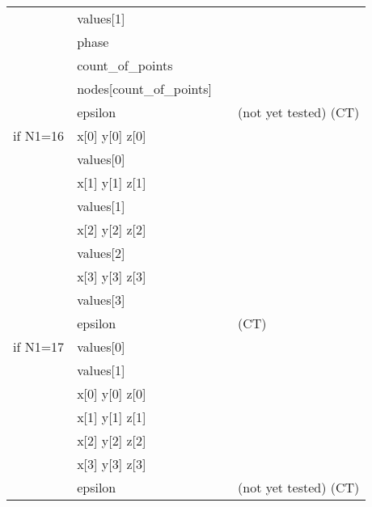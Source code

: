 \begin{tabular}{|p{1.5cm}|p{2.75cm}|c|p{8.5cm}|}
            & {\footnotesize values[1]}            &      &                        \\
            & {\footnotesize phase}                &      &                        \\
            & {\footnotesize count\_of\_points}    &      &                        \\
            & {\footnotesize nodes[count\_of\_points]} &  &                        \\
            & {\footnotesize epsilon}              &      & \hfill (not yet tested) (CT)  \\
%
  \hline
%
  if N1=16  & {\footnotesize x[0] y[0] z[0]}     &      &                        \\
            & {\footnotesize values[0]}          &      &                        \\
            & {\footnotesize x[1] y[1] z[1]}     &      &                        \\
            & {\footnotesize values[1]}          &      &                        \\
            & {\footnotesize x[2] y[2] z[2]}     &      &                        \\
            & {\footnotesize values[2]}          &      &                        \\
            & {\footnotesize x[3] y[3] z[3]}     &      &                        \\
            & {\footnotesize values[3]}          &      &                        \\
            & {\footnotesize epsilon}            &      & \hfill  (CT)           \\
%
  \hline
%

  if N1=17  & {\footnotesize values[0]}          &      &                        \\
            & {\footnotesize values[1]}          &      &                        \\
            & {\footnotesize x[0] y[0] z[0]}     &      &                        \\
            & {\footnotesize x[1] y[1] z[1]}     &      &                        \\
            & {\footnotesize x[2] y[2] z[2]}     &      &                        \\
            & {\footnotesize x[3] y[3] z[3]}     &      &                        \\
            & {\footnotesize epsilon}            &      & \hfill (not yet tested) (CT)  \\
%
  \hline
%
\end{tabular}



